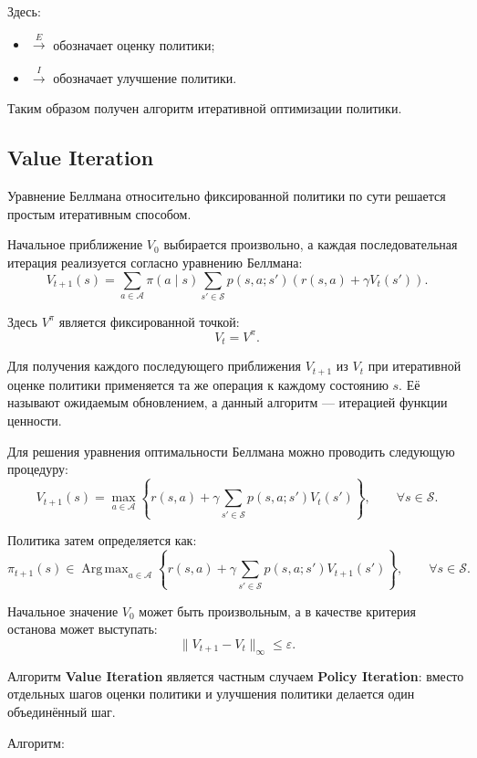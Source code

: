 \documentclass[12pt,a4paper]{article}
\begin{document}
Здесь:
\begin{itemize}
    \item $\xrightarrow{E}$ обозначает оценку политики;
    \item $\xrightarrow{I}$ обозначает улучшение политики.
\end{itemize}

Таким образом получен алгоритм итеративной оптимизации политики.

\subsection{Value Iteration}

Уравнение Беллмана относительно фиксированной политики по сути решается простым итеративным способом.

Начальное приближение $V_0$ выбирается произвольно, а каждая последовательная итерация реализуется согласно уравнению Беллмана:
\[
V_{t+1}(s)
=
\sum_{a \in \mathcal A}
\pi(a \mid s)
\sum_{s' \in \mathcal S}
p(s,a;s')
\left(
r(s,a)+\gamma V_t(s')
\right).
\]

Здесь $V^\pi$ является фиксированной точкой:
\[
V_t = V^\pi.
\]

Для получения каждого последующего приближения $V_{t+1}$ из $V_t$ при итеративной оценке политики применяется та же операция к каждому состоянию $s$. Её называют ожидаемым обновлением, а данный алгоритм --- итерацией функции ценности.

Для решения уравнения оптимальности Беллмана можно проводить следующую процедуру:
\[
V_{t+1}(s)
=
\max_{a \in \mathcal A}
\left\{
r(s,a)
+
\gamma
\sum_{s' \in \mathcal S}
p(s,a;s')V_t(s')
\right\},
\qquad
\forall s \in \mathcal S.
\]

Политика затем определяется как:
\[
\pi_{t+1}(s)
\in
\operatorname{Arg\,max}_{a \in \mathcal A}
\left\{
r(s,a)
+
\gamma
\sum_{s' \in \mathcal S}
p(s,a;s')V_{t+1}(s')
\right\},
\qquad
\forall s \in \mathcal S.
\]

Начальное значение $V_0$ может быть произвольным, а в качестве критерия останова может выступать:
\[
\|V_{t+1}-V_t\|_\infty \le \varepsilon.
\]

Алгоритм \textbf{Value Iteration} является частным случаем \textbf{Policy Iteration}: вместо отдельных шагов оценки политики и улучшения политики делается один объединённый шаг.

Алгоритм:
\end{document}
